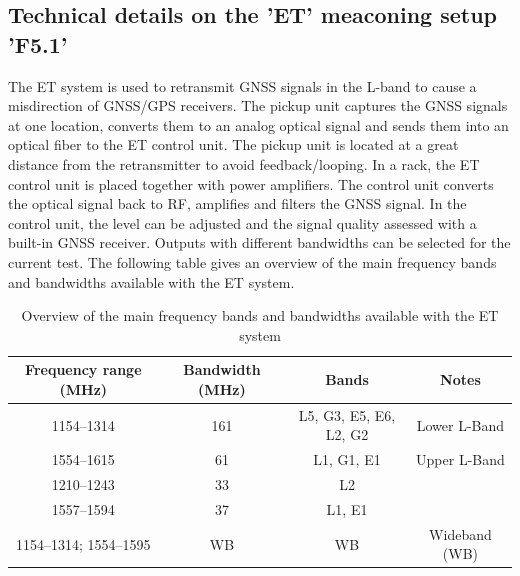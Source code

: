 \subsection{Technical details on the 'ET' meaconing setup 'F5.1'}
The ET system is used to retransmit GNSS signals in the L-band to cause a misdirection of GNSS/GPS receivers. The pickup unit captures the GNSS signals at one location, converts them to an analog optical signal and sends them into an optical fiber to the ET control unit. The pickup unit is located at a great distance from the retransmitter to avoid feedback/looping.
In a rack, the ET control unit is placed together with power amplifiers. The control unit converts the optical signal back to RF, amplifies and filters the GNSS signal. In the control unit, the level can be adjusted and the signal quality assessed with a built-in GNSS receiver. Outputs with different bandwidths can be selected for the current test. The following table gives an overview of the main frequency bands and bandwidths available with the ET system.
\begin{table}[H]
\begin{tabular}{|c|c|c|c|}
\hline
\rowcolor[HTML]{C0C0C0}
\textbf{Frequency range (MHz)} & \textbf{Bandwidth (MHz)} & \textbf{Bands} & \textbf{Notes} \\
\hline
1154--1314 & 161 & L5, G3, E5, E6, L2, G2 & Lower L-Band \\
\hline
1554--1615 & 61 & L1, G1, E1 & Upper L-Band \\
\hline
1210--1243 & 33 & L2 &  \\
\hline
1557--1594 & 37 & L1, E1 &  \\
\hline
1154--1314; 1554--1595 & WB & WB & Wideband (WB) \\
\hline
\end{tabular}
\caption{Overview of the main frequency bands and bandwidths available with the ET system}
\end{table}


